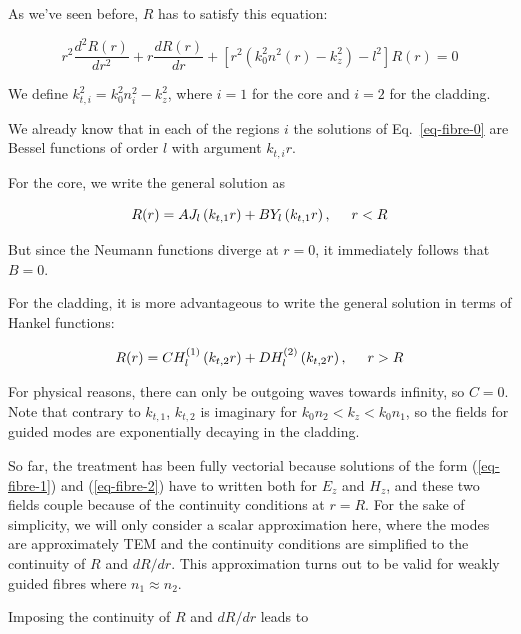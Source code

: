 As we've seen before, $R$ has to satisfy this equation:

\begin{equation}
r^2\frac{d^2 R(r)}{d r^2} + r \frac{d R(r)}{d r} + \left[{r^2 \left(k_0^2 n^2(r) - k_z^2\right) - l^2}\right]R(r) = 0 \label{eq-fibre-0}
\end{equation} 

We define $k_{t,i}^2=k_0^2 n_i^2 - k_z^2$, where $i=1$ for the core and $i=2$ for the cladding.

We already know that in each of the regions $i$ the solutions of Eq.~\ref{eq-fibre-0} are Bessel functions of order $l$ with argument $k_{t,i} r$.

For the core, we write the general solution as

\begin{equation}
R(r) = A J_l\left(k_{t,1}r\right) + B Y_l\left(k_{t,1}r\right), \hspace{0.5 cm} r<R \label{eq-fibre-1}
\end{equation} 

But since the Neumann functions diverge at $r=0$, it immediately follows that $B=0$.

For the cladding, it is more advantageous to write the general solution in terms of Hankel functions:

\begin{equation}
R(r) = C H_l^{(1)}\left(k_{t,2}r\right) + D H_l^{(2)}\left(k_{t,2}r\right), \hspace{0.5 cm} r>R \label{eq-fibre-2}
\end{equation} 

For physical reasons, there can only be outgoing waves towards infinity, so $C=0$. Note that contrary to $k_{t,1}$, $k_{t,2}$ is imaginary for $k_0 n_2 < k_z < k_0 n_1$, so the fields for guided modes are exponentially decaying in the cladding.

So far, the treatment has been fully vectorial because solutions of the form (\ref{eq-fibre-1}) and (\ref{eq-fibre-2}) have to written both for $E_z$ and $H_z$, and these two fields couple because of the continuity conditions at $r=R$. For the sake of simplicity, we will only consider a scalar approximation here, where the modes are approximately TEM and the continuity conditions are simplified to the continuity of $R$ and $d R / d r$. This approximation turns out to be valid for weakly guided fibres where $n_1 \approx n_2$.

Imposing the continuity of $R$ and $d R / dr$ leads to

